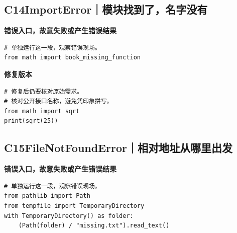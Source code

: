 \subsection*{C14\enspace ImportError｜模块找到了，名字没有}





\textbf{错误入口，故意失败或产生错误结果}

\begin{lstlisting}[style=errorcode,title={错误复现（故意失败或错误结果）：\code{case_14_bad.py.txt}}]
# 单独运行这一段，观察错误现场。
from math import book_missing_function
\end{lstlisting}

\textbf{修复版本}

\begin{lstlisting}[title={\code{case_14.py}}]
# 修复后仍要核对原始需求。
# 核对公开接口名称，避免凭印象拼写。
from math import sqrt
print(sqrt(25))
\end{lstlisting}


\subsection*{C15\enspace FileNotFoundError｜相对地址从哪里出发}





\textbf{错误入口，故意失败或产生错误结果}

\begin{lstlisting}[style=errorcode,title={错误复现（故意失败或错误结果）：\code{case_15_bad.py.txt}}]
# 单独运行这一段，观察错误现场。
from pathlib import Path
from tempfile import TemporaryDirectory
with TemporaryDirectory() as folder:
    (Path(folder) / "missing.txt").read_text()
\end{lstlisting}

